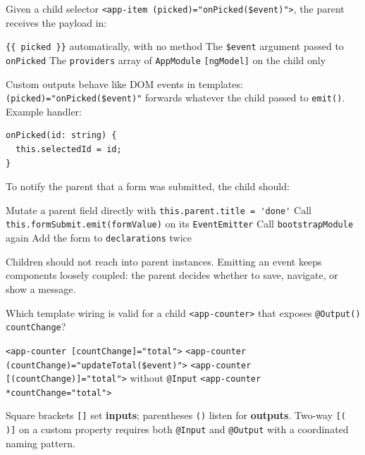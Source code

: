 \question[4]
Given a child selector \lstinline[style=htmlinline]|<app-item (picked)="onPicked($event)">|, the parent receives the payload in:
\begin{choices}
  \choice \lstinline[style=htmlinline]|{{ picked }}| automatically, with no method
  \CorrectChoice The \lstinline[style=tsinline]|$event| argument passed to \lstinline[style=tsinline]|onPicked|
  \choice The \texttt{providers} array of \texttt{AppModule}
  \choice \lstinline[style=htmlinline]|[ngModel]| on the child only
\end{choices}
\begin{solution}
  Custom outputs behave like DOM events in templates: \lstinline[style=htmlinline]|(picked)="onPicked($event)"| forwards whatever the child passed to \lstinline[style=tsinline]|emit()|. Example handler:
\begin{lstlisting}[style=ts]
onPicked(id: string) {
  this.selectedId = id;
}
\end{lstlisting}
\end{solution}

\question[4]
To notify the parent that a form was submitted, the child should:
\begin{choices}
  \choice Mutate a parent field directly with \lstinline[style=tsinline]|this.parent.title = 'done'|
  \CorrectChoice Call \lstinline[style=tsinline]|this.formSubmit.emit(formValue)| on its \lstinline[style=tsinline]|EventEmitter|
  \choice Call \lstinline[style=tsinline]|bootstrapModule| again
  \choice Add the form to \texttt{declarations} twice
\end{choices}
\begin{solution}
  Children should not reach into parent instances. Emitting an event keeps components loosely coupled: the parent decides whether to save, navigate, or show a message.
\end{solution}

\question[4]
Which template wiring is valid for a child \lstinline[style=htmlinline]|<app-counter>| that exposes \lstinline[style=tsinline]|@Output() countChange|?
\begin{choices}
  \choice \lstinline[style=htmlinline]|<app-counter [countChange]="total">|
  \CorrectChoice \lstinline[style=htmlinline]|<app-counter (countChange)="updateTotal($event)">|
  \choice \lstinline[style=htmlinline]|<app-counter [(countChange)]="total">| without \lstinline[style=tsinline]|@Input|
  \choice \lstinline[style=htmlinline]|<app-counter *countChange="total">|
\end{choices}
\begin{solution}
  Square brackets \lstinline[style=htmlinline]|[]| set \textbf{inputs}; parentheses \lstinline[style=htmlinline]|()| listen for \textbf{outputs}. Two-way \lstinline[style=htmlinline]|[( )]| on a custom property requires both \lstinline[style=tsinline]|@Input| and \lstinline[style=tsinline]|@Output| with a coordinated naming pattern.
\end{solution}

